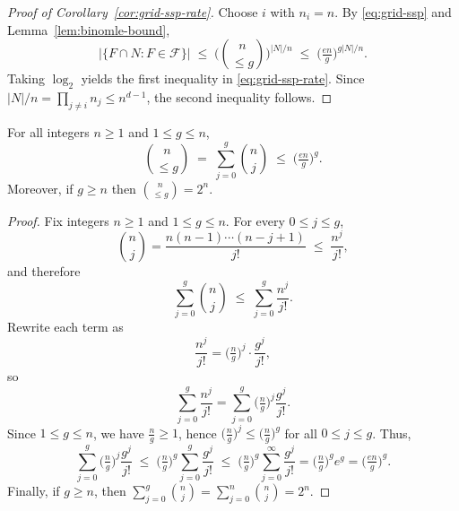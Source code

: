 \documentclass[arxiv]{colt2026}
\newcommand{\F}{\mathcal{F}}
\newcommand{\W}{\mathcal{W}}
\newcommand{\LVC}{\mathrm{LVC}}
\newcommand{\binomle}[2]{\binom{#1}{\le #2}}
\begin{document}
\begin{proof}[Proof of Corollary~\ref{cor:grid-ssp-rate}]
Choose \(i\) with \(n_i=n\). By \eqref{eq:grid-ssp} and Lemma~\ref{lem:binomle-bound},
\[
\big|\{F \cap N : F \in \F\}\big|
\;\le\;
\Big(\binomle{n}{g}\Big)^{|N|/n}
\;\le\;
\Big(\tfrac{en}{g}\Big)^{g|N|/n}.
\]
Taking \(\log_2\) yields the first inequality in \eqref{eq:grid-ssp-rate}.
Since \(|N|/n=\prod_{j\ne i}n_j\le n^{d-1}\), the second inequality follows.
\end{proof}




\begin{lemma}
\label{lem:binomle-bound}
For all integers \(n\ge 1\) and \(1\le g\le n\),
\[
\binomle{n}{g}
\;=\;
\sum_{j=0}^{g}\binom{n}{j}
\;\le\;
\Big(\tfrac{en}{g}\Big)^{g}.
\]
Moreover, if \(g\ge n\) then \(\binomle{n}{g}=2^n\).
\end{lemma}

\begin{proof}
Fix integers \(n\ge 1\) and \(1\le g\le n\).
For every \(0\le j\le g\),
\[
\binom{n}{j}
=
\frac{n(n-1)\cdots(n-j+1)}{j!}
\;\le\;
\frac{n^j}{j!},
\]
and therefore
\[
\sum_{j=0}^{g}\binom{n}{j}
\;\le\;
\sum_{j=0}^{g}\frac{n^j}{j!}.
\]
Rewrite each term as
\[
\frac{n^j}{j!}
=
\Big(\tfrac{n}{g}\Big)^{j}\cdot \frac{g^{j}}{j!},
\]
so
\[
\sum_{j=0}^{g}\frac{n^j}{j!}
=
\sum_{j=0}^{g}\Big(\tfrac{n}{g}\Big)^{j}\frac{g^{j}}{j!}.
\]
Since \(1\le g\le n\), we have \(\tfrac{n}{g}\ge 1\), hence
\(\big(\tfrac{n}{g}\big)^j \le \big(\tfrac{n}{g}\big)^g\) for all \(0\le j\le g\).
Thus,
\[
\sum_{j=0}^{g}\Big(\tfrac{n}{g}\Big)^{j}\frac{g^{j}}{j!}
\;\le\;
\Big(\tfrac{n}{g}\Big)^{g}\sum_{j=0}^{g}\frac{g^{j}}{j!}
\;\le\;
\Big(\tfrac{n}{g}\Big)^{g}\sum_{j=0}^{\infty}\frac{g^{j}}{j!}
=
\Big(\tfrac{n}{g}\Big)^{g} e^{g}
=
\Big(\tfrac{en}{g}\Big)^{g}.
\]
Finally, if \(g\ge n\), then \(\sum_{j=0}^{g}\binom{n}{j}=\sum_{j=0}^{n}\binom{n}{j}=2^n\).
\end{proof}
\end{document}
